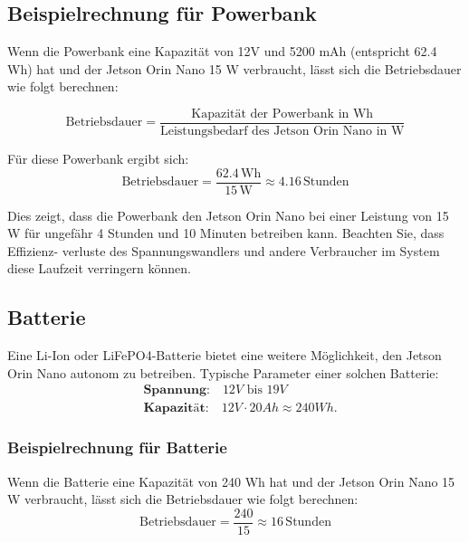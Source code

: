 \documentclass[12pt]{article}
\begin{document}
\subsection{Beispielrechnung für Powerbank}
Wenn die Powerbank eine Kapazität von 12V und 5200 mAh (entspricht 62.4 Wh) hat und der 
Jetson Orin Nano 15 W verbraucht, lässt sich die Betriebsdauer wie folgt berechnen:

\[
\text{Betriebsdauer} = \frac{\text{Kapazität der Powerbank in Wh}}{\text{Leistungsbedarf des Jetson Orin Nano in W}}
\]

Für diese Powerbank ergibt sich:
\[
\text{Betriebsdauer} = \frac{62.4 \, \text{Wh}}{15 \, \text{W}} \approx 4.16 \, \text{Stunden}
\]

Dies zeigt, dass die Powerbank den Jetson Orin Nano bei einer Leistung von 15 W 
\indent für ungefähr 4 Stunden und 10 Minuten betreiben kann. Beachten Sie, dass Effizienz- 
\indent verluste des Spannungswandlers und andere Verbraucher im System diese Laufzeit 
\indent verringern können.

\subsection{Batterie}
Eine Li-Ion oder LiFePO4-Batterie bietet eine weitere Möglichkeit, den Jetson Orin Nano 
autonom zu betreiben. Typische Parameter einer solchen Batterie:
\[
\begin{aligned}
    &\textbf{Spannung:} \quad 12V \text{ bis } 19V \\
    &\textbf{Kapazität:} \quad 12V \cdot 20Ah \approx 240Wh.
\end{aligned}
\]


\subsubsection{Beispielrechnung für Batterie}
Wenn die Batterie eine Kapazität von 240 Wh hat und der Jetson Orin Nano 15 W verbraucht, 
lässt sich die Betriebsdauer wie folgt berechnen:
\[
\text{Betriebsdauer} = \frac{240}{15} \approx 16 \, \text{Stunden}
\]


    
\end{document}
